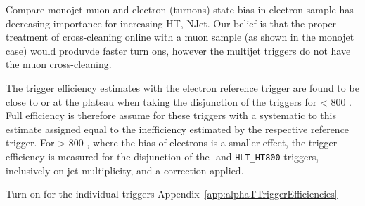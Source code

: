 {\color{blue} Compare monojet muon and electron (turnons) state bias in electron sample has decreasing importance for increasing HT, NJet. 
Our belief is that the proper treatment of cross-cleaning online with a muon sample (as shown in the monojet case) would produvde faster
turn ons, however the multijet triggers do not have the muon cross-cleaning. 

The trigger efficiency estimates with the electron reference trigger are found to be close to or at the plateau when taking the disjunction of the 
triggers for \scalht < 800 \GeV. Full efficiency is therefore assume for these triggers with a systematic to this estimate assigned equal to the 
inefficiency estimated by the respective reference trigger. For \scalht > 800 \GeV, where the bias of electrons is a smaller effect, the trigger 
efficiency is measured for the disjunction of the \scalht-\alphat and \verb!HLT_HT800! triggers, inclusively on jet multiplicity, and a correction applied. 


Turn-on for the individual triggers \alphat Appendix~\ref{app:alphaTTriggerEfficiencies}
}



\begin{figure}[h!]
  \begin{center}
     ~~ 
    \caption{
          }
    \label{fig:alphat_turnons}
  \end{center} 
\end{figure}


